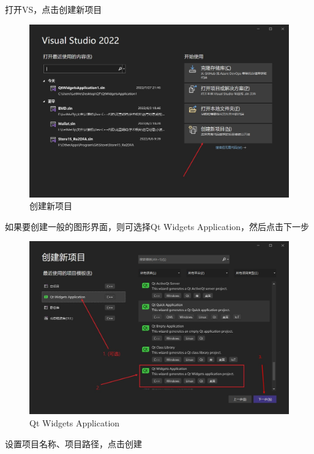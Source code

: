 \documentclass[cs4size,a4paper]{ctexart}
\numberwithin{equation}{section}
\numberwithin{table}{section}
\numberwithin{figure}{section}
\begin{document}
打开VS，点击创建新项目

\begin{figure}[H]
\small
\centering
\includegraphics[width=\textwidth]{创建新项目.jpg}
\caption{创建新项目} \label{fig:创建新项目}
\end{figure}

如果要创建一般的图形界面，则可选择\colorbox{LetMeFlyGray}{Qt Widgets Application}，然后点击\colorbox{LetMeFlyGray}{下一步}


\begin{figure}[H]
\small
\centering
\includegraphics[width=\textwidth]{Qt Widgets Application.jpg}
\caption{Qt Widgets Application} \label{fig:Qt Widgets Application}
\end{figure}

设置项目名称、项目路径，点击创建
\end{document}
